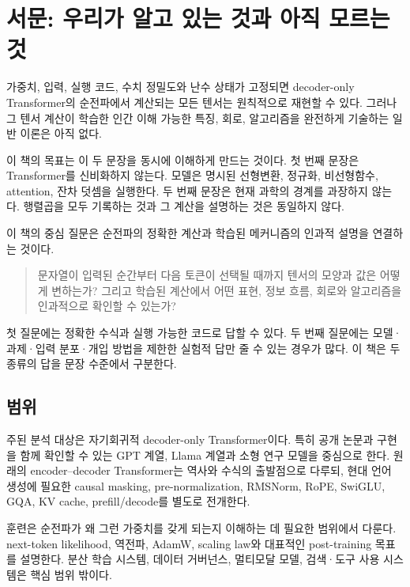 \chapter*{서문: 우리가 알고 있는 것과 아직 모르는 것}

\begin{factbox}
가중치, 입력, 실행 코드, 수치 정밀도와 난수 상태가 고정되면 decoder-only Transformer의 순전파에서 계산되는 모든 텐서는 원칙적으로 재현할 수 있다.
그러나 그 텐서 계산이 학습한 인간 이해 가능한 특징, 회로, 알고리즘을 완전하게 기술하는 일반 이론은 아직 없다.
\end{factbox}

이 책의 목표는 이 두 문장을 동시에 이해하게 만드는 것이다.
첫 번째 문장은 Transformer를 신비화하지 않는다.
모델은 명시된 선형변환, 정규화, 비선형함수, attention, 잔차 덧셈을 실행한다.
두 번째 문장은 현재 과학의 경계를 과장하지 않는다.
행렬곱을 모두 기록하는 것과 그 계산을 설명하는 것은 동일하지 않다.

이 책의 중심 질문은 순전파의 정확한 계산과 학습된 메커니즘의 인과적 설명을 연결하는 것이다.

\begin{quote}
문자열이 입력된 순간부터 다음 토큰이 선택될 때까지 텐서의 모양과 값은 어떻게 변하는가?
그리고 학습된 계산에서 어떤 표현, 정보 흐름, 회로와 알고리즘을 인과적으로 확인할 수 있는가?
\end{quote}

첫 질문에는 정확한 수식과 실행 가능한 코드로 답할 수 있다.
두 번째 질문에는 모델·과제·입력 분포·개입 방법을 제한한 실험적 답만 줄 수 있는 경우가 많다.
이 책은 두 종류의 답을 문장 수준에서 구분한다.

\section*{범위}

주된 분석 대상은 자기회귀적 decoder-only Transformer이다.
특히 공개 논문과 구현을 함께 확인할 수 있는 GPT 계열, Llama 계열과 소형 연구 모델을 중심으로 한다.
원래의 encoder--decoder Transformer는 역사와 수식의 출발점으로 다루되, 현대 언어 생성에 필요한 causal masking, pre-normalization, RMSNorm, RoPE, SwiGLU, GQA, KV cache, prefill/decode를 별도로 전개한다.

훈련은 순전파가 왜 그런 가중치를 갖게 되는지 이해하는 데 필요한 범위에서 다룬다.
next-token likelihood, 역전파, AdamW, scaling law와 대표적인 post-training 목표를 설명한다.
분산 학습 시스템, 데이터 거버넌스, 멀티모달 모델, 검색·도구 사용 시스템은 핵심 범위 밖이다.

